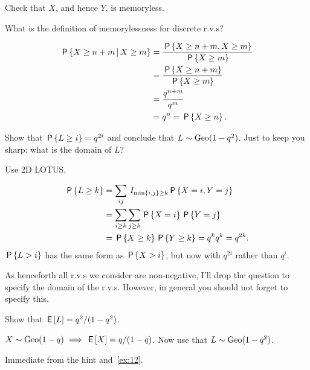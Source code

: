 \documentclass[a4paper,11pt]{article}
\begin{document}
\begin{exercise}
Check that $X$, and hence $Y$, is memoryless.
\begin{hint}
What is the definition of memorylessness for discrete r.v.s?
\end{hint}
\begin{solution}
  \begin{align}
    \label{eq:13}
\P{X\geq n+m\given X\geq m}
&= \frac{ \P{X\geq n+m,  X\geq m}}{\P{X\geq m}} \\
&= \frac{ \P{X\geq n+m}}{\P{X\geq m}} \\
&= \frac{ q^{n+m}}{q^m} \\
&= q^n= \P{X\geq n}.
  \end{align}
\end{solution}
\end{exercise}

\begin{exercise}\label{ex:12}
Show that $\P{L\geq i}=q^{2i}$ and conclude that $L\sim\Geo{1-q^{2}}$. Just to keep you sharp: what is the domain of $L$?
\begin{hint}
  Use 2D LOTUS.
\end{hint}
\begin{solution}
  \begin{align}
    \label{eq:12}
\P{L\geq k}
&= \sum_{ij} \1{\min\{i,j\}\geq k} \P{X=i, Y=j}\\
&= \sum_{i\geq k} \sum_{j\geq k} \P{X=i}\P{Y=j}\\
&=  \P{X\geq k}\P{Y\geq k} = q^{k} q^{k} = q^{2k}.
  \end{align}
$\P{L>i}$ has the same form as $\P{X>i}$, but now with $q^{2i}$ rather than $q^{i}$.
\end{solution}
\end{exercise}

As henceforth all r.v.s we consider are non-negative, I'll drop the question to specify the domain of the r.v.s. However, in general you should not forget to specify this.



\begin{exercise}\label{ex:3}
Show that  $\E L=q^{2}/(1-q^{2})$.
\begin{hint}
$X\sim \Geo{1-q} \implies \E X = q/(1-q)$. Now use that $L\sim\Geo{1-q^{2}}$.
\end{hint}
\begin{solution}
  Immediate from the hint and~\cref{ex:12}.
\end{solution}
\end{exercise}
\end{document}
